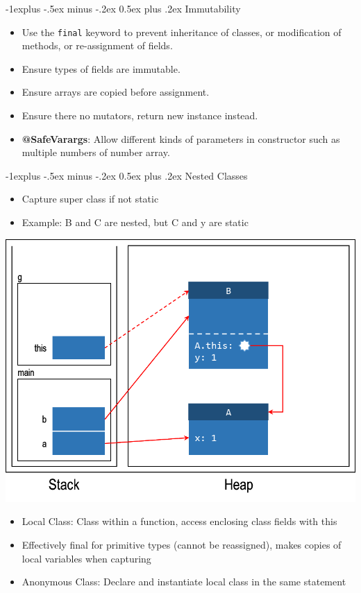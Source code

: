 \documentclass[10pt, landscape]{article}
\makeatletter
\renewcommand{\section}{\@startsection{section}{1}{0mm}%
                                {-1ex plus -.5ex minus -.2ex}%
                                {0.5ex plus .2ex}%
                                {\normalfont\large\bfseries}}
\renewcommand{\section}{\@startsection{section}{2}{0mm}%
                                {-1explus -.5ex minus -.2ex}%
                                {0.5ex plus .2ex}%
                                {\normalfont\normalsize\bfseries}}
\makeatother
\begin{document}
\begin{multicols*}{4}
\section{Immutability}
\begin{itemize}
    \item Use the \verb|final| keyword to prevent inheritance of classes, or modification of methods, or re-assignment of fields.
    \item Ensure types of fields are immutable.
    \item Ensure arrays are copied before assignment.
    \item Ensure there no mutators, return new instance instead.
    \item \textbf{@SafeVarargs}: Allow different kinds of parameters in constructor such as multiple numbers of number array.
\end{itemize}

\section{Nested Classes}
\begin{itemize}
    \item Capture super class if not static
    \item Example: B and C are nested, but C and y are static
\end{itemize}
\includegraphics[width=\linewidth]{010f.png}
\begin{itemize}
    \item Local Class: Class within a function, access enclosing class fields with this
    \item Effectively final for primitive types (cannot be reassigned), makes copies of local variables when capturing
    \item Anonymous Class: Declare and instantiate local class in the same statement
\end{itemize}


\end{multicols*}
\end{document}
